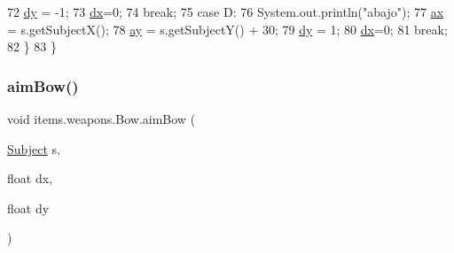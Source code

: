 \begin{DoxyCode}
72                 \mbox{\hyperlink{classitems_1_1weapons_1_1_bow_a64b7302a20f953d5940e5063d523d772}{dy}} = -1;
73                 \mbox{\hyperlink{classitems_1_1weapons_1_1_bow_a5f5ced169bab348188e9b06ac6862a2b}{dx}}=0;
74                 \textcolor{keywordflow}{break};
75             \textcolor{keywordflow}{case} D:
76                 System.out.println(\textcolor{stringliteral}{"abajo"});
77                 \mbox{\hyperlink{classitems_1_1weapons_1_1_bow_aff7d073599101d3aaad0f525ef067eac}{ax}} = s.getSubjectX();
78                 \mbox{\hyperlink{classitems_1_1weapons_1_1_bow_a3180294cbe39f9b47eea37815dc1c4f6}{ay}} = s.getSubjectY() + 30;
79                 \mbox{\hyperlink{classitems_1_1weapons_1_1_bow_a64b7302a20f953d5940e5063d523d772}{dy}} = 1;
80                 \mbox{\hyperlink{classitems_1_1weapons_1_1_bow_a5f5ced169bab348188e9b06ac6862a2b}{dx}}=0;
81                 \textcolor{keywordflow}{break};
82         \}
83     \}
\end{DoxyCode}
\mbox{\label{classitems_1_1weapons_1_1_bow_af54ddd6eaf7209320e6ab870ce513ddc}} 
\subsubsection{\texorpdfstring{aim\+Bow()}{aimBow()}\hspace{0.1cm}{\footnotesize\ttfamily [2/2]}}
{\footnotesize\ttfamily void items.\+weapons.\+Bow.\+aim\+Bow (\begin{DoxyParamCaption}\item[{\mbox{\hyperlink{classentities_1_1_subject}{Subject}}}]{s,  }\item[{float}]{dx,  }\item[{float}]{dy }\end{DoxyParamCaption})\hspace{0.3cm}{\ttfamily [inline]}}



